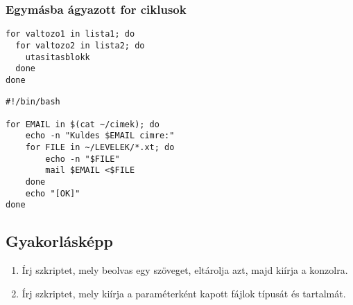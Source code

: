 \subsubsection*{Egymásba ágyazott for ciklusok}
\begin{lstlisting}
for valtozo1 in lista1; do
  for valtozo2 in lista2; do
    utasitasblokk
  done
done
\end{lstlisting}\bigskip

\begin{lstlisting}
#!/bin/bash

for EMAIL in $(cat ~/cimek); do
    echo -n "Kuldes $EMAIL cimre:"
    for FILE in ~/LEVELEK/*.xt; do
        echo -n "$FILE"
        mail $EMAIL <$FILE
    done
    echo "[OK]"
done
\end{lstlisting}




\subsection*{Gyakorlásképp}
\begin{enumerate}
\item Írj szkriptet, mely beolvas egy szöveget, eltárolja azt, majd kiírja a konzolra.
\item Írj szkriptet, mely kiírja a paraméterként kapott fájlok típusát és tartalmát.
\end{enumerate}



